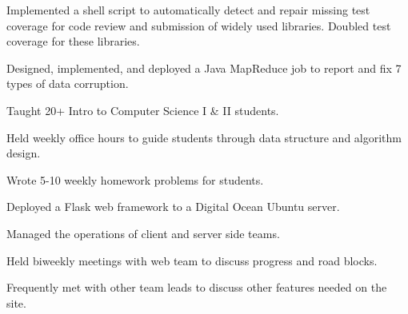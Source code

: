 \documentclass[letterpaper]{deedy-resume} %
\begin{document}
\begin{minipage}[t]{0.66\textwidth}

\begin{tightitemize}
\item Implemented a shell script to automatically detect and repair missing test coverage for code review and submission of widely used libraries. Doubled test coverage for these libraries.
\item Designed, implemented, and deployed a Java MapReduce job to report and fix 7 types of data corruption.
\end{tightitemize}

\sectionspace %



\begin{tightitemize}
\item Taught 20+ Intro to Computer Science I \& II students.
\item Held weekly office hours to guide students through data structure and algorithm design.
\item Wrote 5-10 weekly homework problems for students.
\end{tightitemize}

\sectionspace %



\begin{tightitemize}
\item Deployed a Flask web framework to a Digital Ocean Ubuntu server.
\item Managed the operations of client and server side teams.
\item Held biweekly meetings with web team to discuss progress and road blocks.
\item Frequently met with other team leads to discuss other features needed on the site.
\end{tightitemize}




\end{minipage}
\end{document}

